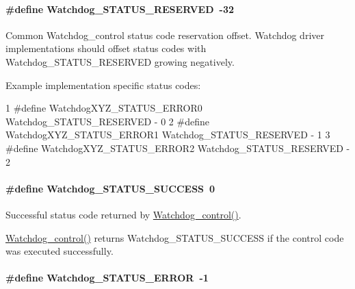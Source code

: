 \paragraph[{Watchdog\+\_\+\+S\+T\+A\+T\+U\+S\+\_\+\+R\+E\+S\+E\+R\+V\+E\+D}]{\setlength{\rightskip}{0pt plus 5cm}\#define Watchdog\+\_\+\+S\+T\+A\+T\+U\+S\+\_\+\+R\+E\+S\+E\+R\+V\+E\+D~-\/32}\label{_watchdog_8h_af7d1273929fd4d1f630c31b90def9684}
Common Watchdog\+\_\+control status code reservation offset. Watchdog driver implementations should offset status codes with Watchdog\+\_\+\+S\+T\+A\+T\+U\+S\+\_\+\+R\+E\+S\+E\+R\+V\+E\+D growing negatively.

Example implementation specific status codes\+: 
\begin{DoxyCode}
1 #define WatchdogXYZ\_STATUS\_ERROR0    Watchdog\_STATUS\_RESERVED - 0
2 #define WatchdogXYZ\_STATUS\_ERROR1    Watchdog\_STATUS\_RESERVED - 1
3 #define WatchdogXYZ\_STATUS\_ERROR2    Watchdog\_STATUS\_RESERVED - 2
\end{DoxyCode}
\paragraph[{Watchdog\+\_\+\+S\+T\+A\+T\+U\+S\+\_\+\+S\+U\+C\+C\+E\+S\+S}]{\setlength{\rightskip}{0pt plus 5cm}\#define Watchdog\+\_\+\+S\+T\+A\+T\+U\+S\+\_\+\+S\+U\+C\+C\+E\+S\+S~0}\label{_watchdog_8h_aa8dd490de97398b1da33798d8e54b53f}


Successful status code returned by \hyperlink{_watchdog_8h_aa98a75361edb1e476432669169f2950e}{Watchdog\+\_\+control()}. 

\hyperlink{_watchdog_8h_aa98a75361edb1e476432669169f2950e}{Watchdog\+\_\+control()} returns Watchdog\+\_\+\+S\+T\+A\+T\+U\+S\+\_\+\+S\+U\+C\+C\+E\+S\+S if the control code was executed successfully. 
\paragraph[{Watchdog\+\_\+\+S\+T\+A\+T\+U\+S\+\_\+\+E\+R\+R\+O\+R}]{\setlength{\rightskip}{0pt plus 5cm}\#define Watchdog\+\_\+\+S\+T\+A\+T\+U\+S\+\_\+\+E\+R\+R\+O\+R~-\/1}\label{_watchdog_8h_a7cc28c1119ebecae88a5ae0735228489}


